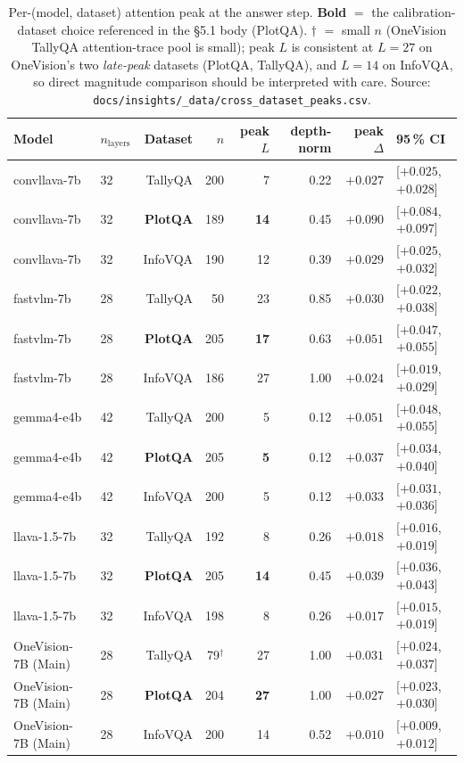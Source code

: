 \documentclass[11pt]{article}
\begin{document}
\begin{table}[h]
  \centering
  \small
  \begin{tabular}{llrrrrrl}
    \toprule
    \textbf{Model} & \textbf{$n_\text{layers}$} & \textbf{Dataset} & \textbf{$n$} & \textbf{peak $L$} & \textbf{depth-norm} & \textbf{peak $\Delta$} & \textbf{95\,\% CI} \\
    \midrule
    convllava-7b & 32 & TallyQA & 200 & 7 & 0.22 & $+0.027$ & [$+0.025$, $+0.028$] \\
    convllava-7b & 32 & \textbf{PlotQA} & 189 & \textbf{14} & 0.45 & $+0.090$ & [$+0.084$, $+0.097$] \\
    convllava-7b & 32 & InfoVQA & 190 & 12 & 0.39 & $+0.029$ & [$+0.025$, $+0.032$] \\
    fastvlm-7b   & 28 & TallyQA & 50 & 23 & 0.85 & $+0.030$ & [$+0.022$, $+0.038$] \\
    fastvlm-7b   & 28 & \textbf{PlotQA} & 205 & \textbf{17} & 0.63 & $+0.051$ & [$+0.047$, $+0.055$] \\
    fastvlm-7b   & 28 & InfoVQA & 186 & 27 & 1.00 & $+0.024$ & [$+0.019$, $+0.029$] \\
    gemma4-e4b   & 42 & TallyQA & 200 & 5 & 0.12 & $+0.051$ & [$+0.048$, $+0.055$] \\
    gemma4-e4b   & 42 & \textbf{PlotQA} & 205 & \textbf{5} & 0.12 & $+0.037$ & [$+0.034$, $+0.040$] \\
    gemma4-e4b   & 42 & InfoVQA & 200 & 5 & 0.12 & $+0.033$ & [$+0.031$, $+0.036$] \\
    llava-1.5-7b & 32 & TallyQA & 192 & 8 & 0.26 & $+0.018$ & [$+0.016$, $+0.019$] \\
    llava-1.5-7b & 32 & \textbf{PlotQA} & 205 & \textbf{14} & 0.45 & $+0.039$ & [$+0.036$, $+0.043$] \\
    llava-1.5-7b & 32 & InfoVQA & 198 & 8 & 0.26 & $+0.017$ & [$+0.015$, $+0.019$] \\
    OneVision-7B (Main) & 28 & TallyQA & 79$^\dagger$ & 27 & 1.00 & $+0.031$ & [$+0.024$, $+0.037$] \\
    OneVision-7B (Main) & 28 & \textbf{PlotQA} & 204 & \textbf{27} & 1.00 & $+0.027$ & [$+0.023$, $+0.030$] \\
    OneVision-7B (Main) & 28 & InfoVQA & 200 & 14 & 0.52 & $+0.010$ & [$+0.009$, $+0.012$] \\
    \bottomrule
  \end{tabular}
  \caption{Per-(model, dataset) attention peak at the answer step. \textbf{Bold} $=$ the calibration-dataset choice referenced in the \S5.1 body (PlotQA). $\dagger$ $=$ small $n$ (OneVision TallyQA attention-trace pool is small); peak $L$ is consistent at $L=27$ on OneVision's two \textit{late-peak} datasets (PlotQA, TallyQA), and $L=14$ on InfoVQA, so direct magnitude comparison should be interpreted with care. Source: \texttt{docs/insights/\_data/cross\_dataset\_peaks.csv}.}
  \label{tab:attention-peak}
\end{table}
\end{document}
